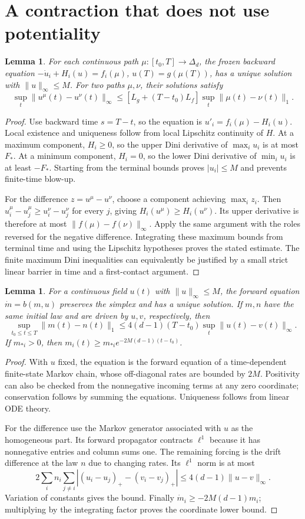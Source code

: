\documentclass[11pt]{article}
\newtheorem{lemma}[theorem]{Lemma}
\begin{document}
\section{A contraction that does not use potentiality}
\begin{lemma}\label{frozen}
For each continuous path $\mu:[t_0,T]\to\Delta_d$, the frozen backward equation
$-\dot u_i+H_i(u)=f_i(\mu)$, $u(T)=g(\mu(T))$, has a unique solution with $\|u\|_\infty\le M$. For two paths $\mu,\nu$, their solutions satisfy
\[
 \sup_t\|u^\mu(t)-u^\nu(t)\|_\infty
 \le[L_g+(T-t_0)L_f]\sup_t\|\mu(t)-\nu(t)\|_1.
\]
\end{lemma}
\begin{proof}
Use backward time $s=T-t$, so the equation is $u'_i=f_i(\mu)-H_i(u)$. Local existence and uniqueness follow from local Lipschitz continuity of $H$. At a maximum component, $H_i\ge0$, so the upper Dini derivative of $\max_i u_i$ is at most $F_*$. At a minimum component, $H_i=0$, so the lower Dini derivative of $\min_i u_i$ is at least $-F_*$. Starting from the terminal bounds proves $|u_i|\le M$ and prevents finite-time blow-up.

For the difference $z=u^\mu-u^\nu$, choose a component achieving $\max_i z_i$. Then $u_i^\mu-u_j^\mu\ge u_i^\nu-u_j^\nu$ for every $j$, giving $H_i(u^\mu)\ge H_i(u^\nu)$. Its upper derivative is therefore at most $\|f(\mu)-f(\nu)\|_\infty$. Apply the same argument with the roles reversed for the negative difference. Integrating these maximum bounds from terminal time and using the Lipschitz hypotheses proves the stated estimate. The finite maximum Dini inequalities can equivalently be justified by a small strict linear barrier in time and a first-contact argument.
\end{proof}

\begin{lemma}\label{forward}
For a continuous field $u(t)$ with $\|u\|_\infty\le M$, the forward equation $\dot m=b(m,u)$ preserves the simplex and has a unique solution. If $m,n$ have the same initial law and are driven by $u,v$, respectively, then
\[
 \sup_{t_0\le t\le T}\|m(t)-n(t)\|_1
 \le4(d-1)(T-t_0)\sup_t\|u(t)-v(t)\|_\infty.
\]
If $m_{*i}>0$, then $m_i(t)\ge m_{*i}e^{-2M(d-1)(t-t_0)}$.
\end{lemma}
\begin{proof}
With $u$ fixed, the equation is the forward equation of a time-dependent finite-state Markov chain, whose off-diagonal rates are bounded by $2M$. Positivity can also be checked from the nonnegative incoming terms at any zero coordinate; conservation follows by summing the equations. Uniqueness follows from linear ODE theory.

For the difference use the Markov generator associated with $u$ as the homogeneous part. Its forward propagator contracts $\ell^1$ because it has nonnegative entries and column sums one. The remaining forcing is the drift difference at the law $n$ due to changing rates. Its $\ell^1$ norm is at most
\[
 2\sum_i n_i\sum_{j\ne i}|(u_i-u_j)_+-(v_i-v_j)_+|
 \le4(d-1)\|u-v\|_\infty.
\]
Variation of constants gives the bound. Finally $\dot m_i\ge-2M(d-1)m_i$; multiplying by the integrating factor proves the coordinate lower bound.
\end{proof}
\end{document}
